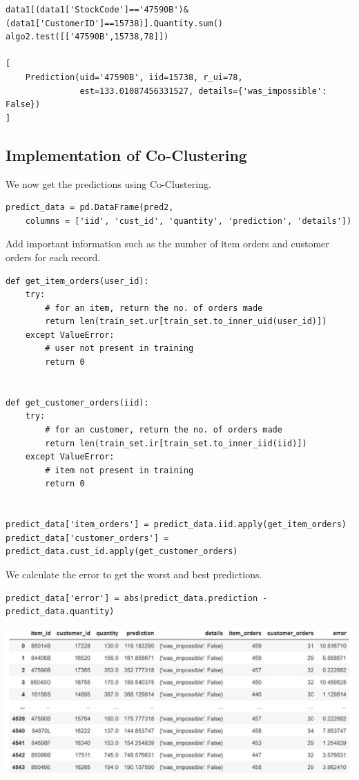 \documentclass{article}
\begin{document}
\begin{lstlisting}
data1[(data1['StockCode']=='47590B')&(data1['CustomerID']==15738)].Quantity.sum()
algo2.test([['47590B',15738,78]])

[
    Prediction(uid='47590B', iid=15738, r_ui=78,
               est=133.01087456331527, details={'was_impossible': False})
]
\end{lstlisting}

\subsection{Implementation of Co-Clustering}

We now get the predictions using Co-Clustering.

\begin{lstlisting}
predict_data = pd.DataFrame(pred2,
    columns = ['iid', 'cust_id', 'quantity', 'prediction', 'details'])

\end{lstlisting}

Add important information such as the number of item orders and customer orders for each record.

\begin{lstlisting}
def get_item_orders(user_id):
    try:
        # for an item, return the no. of orders made
        return len(train_set.ur[train_set.to_inner_uid(user_id)])
    except ValueError:
        # user not present in training
        return 0


def get_customer_orders(iid):
    try:
        # for an customer, return the no. of orders made
        return len(train_set.ir[train_set.to_inner_iid(iid)])
    except ValueError:
        # item not present in training
        return 0


predict_data['item_orders'] = predict_data.iid.apply(get_item_orders)
predict_data['customer_orders'] = predict_data.cust_id.apply(get_customer_orders)
\end{lstlisting}

We calculate the error to get the worst and best predictions.

\begin{lstlisting}
predict_data['error'] = abs(predict_data.prediction - predict_data.quantity)
\end{lstlisting}

\begin{center}
\includegraphics[scale=0.45]{06.png}
\end{center}
\end{document}
